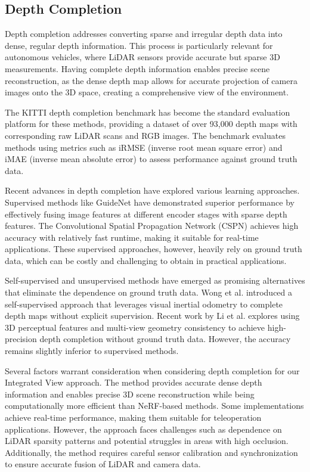 \subsection{Depth Completion}

Depth completion addresses converting sparse and irregular depth data into dense, regular depth information. This process is particularly relevant for autonomous vehicles, where LiDAR sensors provide accurate but sparse 3D measurements. Having complete depth information enables precise scene reconstruction, as the dense depth map allows for accurate projection of camera images onto the 3D space, creating a comprehensive view of the environment\cite{tang2023comprehensive}.

The KITTI depth completion benchmark has become the standard evaluation platform for these methods\cite{uhrig2017sparsity}, providing a dataset of over 93,000 depth maps with corresponding raw LiDAR scans and RGB images. The benchmark evaluates methods using metrics such as iRMSE (inverse root mean square error) and iMAE (inverse mean absolute error) to assess performance against ground truth data.

Recent advances in depth completion have explored various learning approaches. Supervised methods like GuideNet have demonstrated superior performance by effectively fusing image features at different encoder stages with sparse depth features\cite{tang2023guidenet}. The Convolutional Spatial Propagation Network (CSPN) achieves high accuracy with relatively fast runtime, making it suitable for real-time applications\cite{cheng2020cspn}. These supervised approaches, however, heavily rely on ground truth data, which can be costly and challenging to obtain in practical applications.

Self-supervised and unsupervised methods have emerged as promising alternatives that eliminate the dependence on ground truth data. Wong et al. introduced a self-supervised approach that leverages visual inertial odometry to complete depth maps without explicit supervision\cite{wong2020unsupervised}. Recent work by Li et al. explores using 3D perceptual features and multi-view geometry consistency to achieve high-precision depth completion without ground truth data\cite{li2023self}. However, the accuracy remains slightly inferior to supervised methods.

Several factors warrant consideration when considering depth completion for our Integrated View approach. The method provides accurate dense depth information and enables precise 3D scene reconstruction while being computationally more efficient than NeRF-based methods. Some implementations achieve real-time performance, making them suitable for teleoperation applications. However, the approach faces challenges such as dependence on LiDAR sparsity patterns and potential struggles in areas with high occlusion. Additionally, the method requires careful sensor calibration and synchronization to ensure accurate fusion of LiDAR and camera data.

